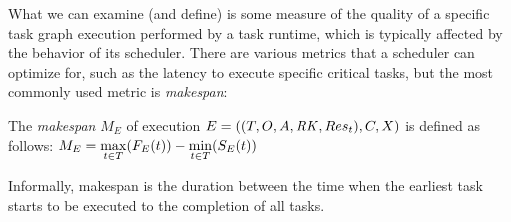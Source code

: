 What we can examine (and define) is some measure of the quality of a specific task graph execution
performed by a task runtime, which is typically affected by the behavior of its scheduler. There
are various metrics that a scheduler can optimize for, such as the latency to execute specific
critical tasks, but the most commonly used metric is \emph{makespan}:

\vspace{2mm} The \emph{makespan} $M_E$ of execution
$E = ((T, O, A, \mathit{RK}, Res_t), C, X)$
is defined as follows: $M_E = \max\limits_{t\in T}(F_E(t)) - \min\limits_{t\in T}(S_E(t))$

\vspace{2mm}Informally, makespan is the duration between the time when the earliest task starts
to be executed to the completion of all tasks.

